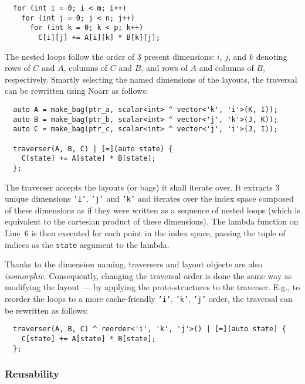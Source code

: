 \begin{verbatim}
  for (int i = 0; i < m; i++)
    for (int j = 0; j < n; j++)
      for (int k = 0; k < p; k++)
        C[i][j] += A[i][k] * B[k][j];
\end{verbatim}
The nested loops follow the order of $3$ present dimensions: $i$, $j$, and $k$ denoting rows of $C$ and $A$, columns of $C$ and $B$, and rows of $A$ and columns of $B$, respectively. Smartly selecting the named dimensions of the layouts, the traversal can be rewritten using Noarr as follows:

\begin{verbatim}
  auto A = make_bag(ptr_a, scalar<int> ^ vector<'k', 'i'>(K, I));
  auto B = make_bag(ptr_b, scalar<int> ^ vector<'j', 'k'>(J, K));
  auto C = make_bag(ptr_c, scalar<int> ^ vector<'j', 'i'>(J, I));

  traverser(A, B, C) | [=](auto state) {
    C[state] += A[state] * B[state];
  };
\end{verbatim}
The traverser accepts the layouts (or bags) it shall iterate over. It extracts $3$ unique dimensions \texttt{'i'}, \texttt{'j'} and \texttt{'k'} and iterates over the index space composed of these dimensions as if they were written as a sequence of nested loops (which is equivalent to the cartesian product of these dimensions). The lambda function on Line~$6$ is then executed for each point in the index space, passing the tuple of indices as the \texttt{state} argument to the lambda.

Thanks to the dimension naming, traversers and layout objects are also \emph{isomorphic}. Consequently, changing the traversal order is done the same way as modifying the layout --- by applying the proto-structures to the traverser. E.g., to reorder the loops to a more cache-friendly \texttt{'i'}, \texttt{'k'}, \texttt{'j'} order, the traversal can be rewritten as follows:
\begin{verbatim}
  traverser(A, B, C) ^ reorder<'i', 'k', 'j'>() | [=](auto state) {
    C[state] += A[state] * B[state];
  };
\end{verbatim}


\subsubsection{Reusability}

